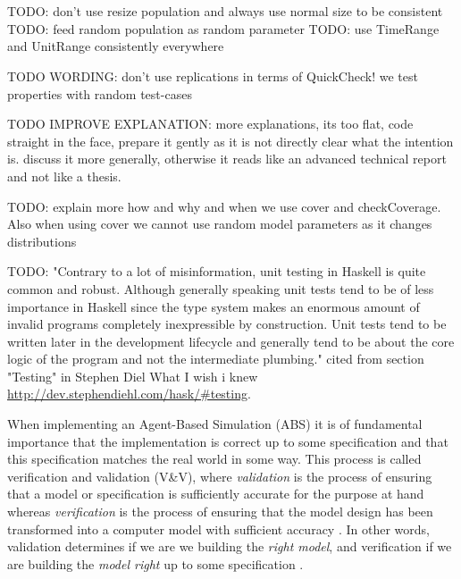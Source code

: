 \chapter*{} %
\label{ch:property}

TODO: don't use resize population and always use normal size to be consistent
TODO: feed random population as random parameter
TODO: use TimeRange and UnitRange consistently everywhere

TODO WORDING: don't use replications in terms of QuickCheck! we test properties with random test-cases

TODO IMPROVE EXPLANATION: more explanations, its too flat, code straight in the face, prepare it gently as it is not directly clear what the intention is. discuss it more generally, otherwise it reads like an advanced technical report and not like a thesis.

TODO: explain more how and why and when we use cover and checkCoverage. Also when using cover we cannot use random model parameters as it changes distributions

TODO: "Contrary to a lot of misinformation, unit testing in Haskell is quite common and robust. Although generally speaking unit tests tend to be of less importance in Haskell since the type system makes an enormous amount of invalid programs completely inexpressible by construction. Unit tests tend to be written later in the development lifecycle and generally tend to be about the core logic of the program and not the intermediate plumbing." cited from section "Testing" in Stephen Diel What I wish i knew \url{http://dev.stephendiehl.com/hask/#testing}.

When implementing an Agent-Based Simulation (ABS) it is of fundamental importance that the implementation is correct up to some specification and that this specification matches the real world in some way. This process is called verification and validation (V\&V), where \textit{validation} is the process of ensuring that a model or specification is sufficiently accurate for the purpose at hand whereas \textit{verification} is the process of ensuring that the model design has been transformed into a computer model with sufficient accuracy \cite{robinson_simulation:_2014}. In other words, validation determines if we are we building the \textit{right model}, and verification if we are building the \textit{model right} up to some specification \cite{balci_verification_1998}.

